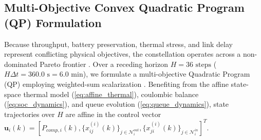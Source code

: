 \documentclass[journal]{IEEEtran}
\begin{document}
\subsection{Multi-Objective Convex Quadratic Program (QP) Formulation}
Because throughput, battery preservation, thermal stress, and link delay represent conflicting physical objectives, the constellation operates across a non-dominated Pareto frontier \cite{boyd2011distributed}. Over a receding horizon $H = 36\text{ steps}$ ($H \Delta t = 360.0\text{ s} = 6.0\text{ min}$), we formulate a multi-objective Quadratic Program (QP) employing weighted-sum scalarization \cite{mayne2014model, morgan2014model, liu2015greening}. Benefiting from the affine state-space thermal model (\ref{eq:affine_thermal}), coulombic balance (\ref{eq:soc_dynamics}), and queue evolution (\ref{eq:queue_dynamics}), state trajectories over $H$ are affine in the control vector $\mathbf{u}_i(k) = [P_{comp,i}(k), \{x_{ij}^{(i)}(k)\}_{j \in \mathcal{N}_i^{out}}, \{x_{ji}^{(i)}(k)\}_{j \in \mathcal{N}_i^{in}}]^T$.
\end{document}
